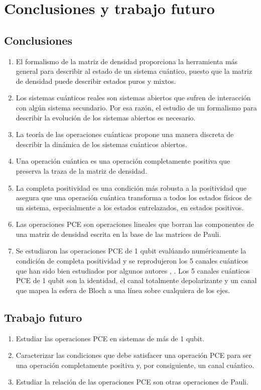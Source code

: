 \chapter{Conclusiones y trabajo futuro}
\section{Conclusiones}
\begin{enumerate}
\item El formalismo de la matriz de densidad proporciona la herramienta 
más general para describir al estado de un sistema cuántico, 
puesto que la matriz de densidad puede describir estados puros y mixtos.
\item Los sistemas cuánticos reales son sistemas abiertos que sufren
de interacción con algún sistema secundario. Por esa razón, el estudio 
de un formalismo para describir la evolución de los sistemas abiertos
es necesario.
\item La teoría de las operaciones cuánticas propone una manera
discreta de describir la dinámica de los sistemas cuánticos abiertos.
\item Una operación cuántica es una operación completamente positiva 
que preserva la traza de la matriz de densidad. 
\item La completa positividad es una condición más robusta a la 
positividad que asegura que una operación cuántica transforma
a todos los estados físicos de un sistema, especialmente a los estados 
entrelazados, en estados positivos.
\item Las operaciones PCE son operaciones lineales que borran las 
componentes de una matriz de densidad escrita en la base de las 
matrices de Pauli.
\item Se estudiaron las operaciones PCE de 1 qubit evalúando numéricamente
la condición de completa positividad y se reprodujeron los 5 canales cuánticos
que han sido bien estudiados por algunos autores
\cite{nielsen_chuang_2011},
\cite{bengtsson_zyczkowski_2017}. Los 5 canales cuánticos PCE 
de 1 qubit son la identidad, el canal totalmente depolarizante y 
un canal que mapea la esfera de Bloch a una línea sobre cualquiera de los ejes.
\end{enumerate}

\pagebreak

\section{Trabajo futuro}
\begin{enumerate}
\item Estudiar las operaciones PCE en sistemas de más de 1 qubit.
\item Caracterizar las condiciones que debe satisfacer una operación 
PCE para ser una operación completamente positiva y, por consiguiente,
un canal cuántico.
\item Estudiar la relación de las operaciones PCE son otras operaciones 
de Pauli. 
\end{enumerate}
